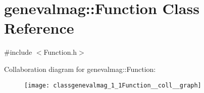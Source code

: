 \hypertarget{classgenevalmag_1_1Function}{
\section{genevalmag::Function Class Reference}
\label{classgenevalmag_1_1Function}
}


{\ttfamily \#include $<$Function.h$>$}



Collaboration diagram for genevalmag::Function:\nopagebreak
\begin{figure}[H]
\begin{center}
\leavevmode
\texttt{[image: classgenevalmag\_1\_1Function\_\_coll\_\_graph]}
\end{center}
\end{figure}
